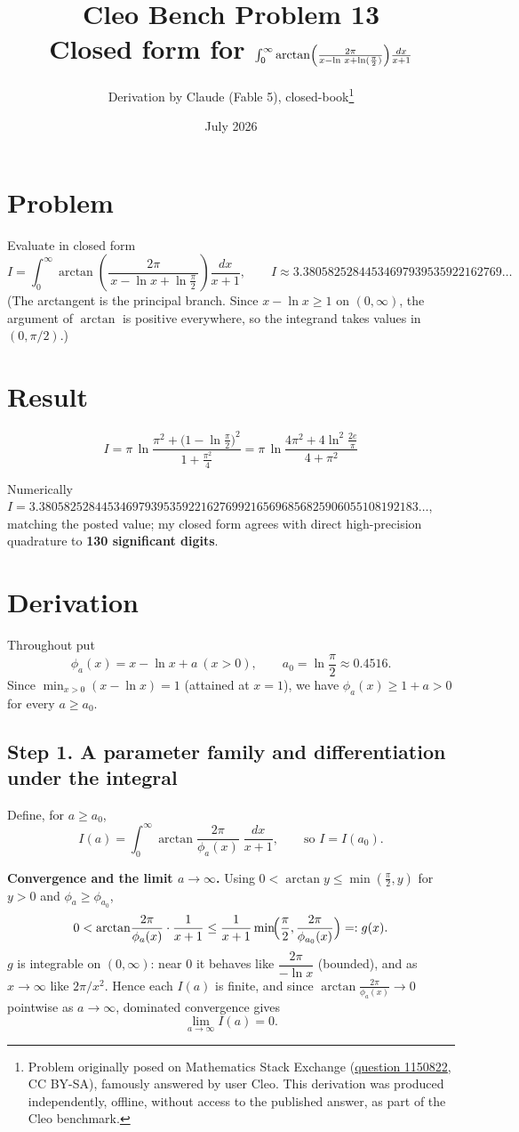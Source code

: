 \documentclass[11pt]{article}
\title{Cleo Bench Problem 13\\[1ex]\large Closed form for $\int_0^\infty\arctan\Bigl(\frac{2\pi}{x-\ln\,x+\ln(\frac\pi2)}\Bigr)\frac{dx}{x+1}$}
\author{Derivation by Claude (Fable 5), closed-book\thanks{Problem originally
posed on Mathematics Stack Exchange
(\href{https://math.stackexchange.com/q/1150822}{question 1150822}, CC BY-SA),
famously answered by user Cleo. This derivation was produced independently,
offline, without access to the published answer, as part of the Cleo benchmark.}}
\date{July 2026}
\theoremstyle{remark}
\begin{document}
\maketitle

\section*{Problem}

Evaluate in closed form
$$I=\int_0^\infty\arctan\!\left(\frac{2\pi}{\,x-\ln x+\ln\frac{\pi}{2}\,}\right)\frac{dx}{x+1},
\qquad I\approx 3.38058252844534697939535922162769\ldots$$
(The arctangent is the principal branch. Since $x-\ln x\ge 1$ on $(0,\infty)$, the argument of $\arctan$ is positive everywhere, so the integrand takes values in $(0,\pi/2)$.)

\section*{Result}

$$\boxed{\;I=\pi\,\ln\!\frac{\pi^{2}+\bigl(1-\ln\frac{\pi}{2}\bigr)^{2}}{1+\frac{\pi^{2}}{4}}
=\pi\,\ln\!\frac{4\pi^{2}+4\ln^{2}\!\frac{2e}{\pi}}{4+\pi^{2}}\;}$$

Numerically $I = 3.3805825284453469793953592216276992165696856825906055108192183\ldots$, matching the posted value; my closed form agrees with direct high-precision quadrature to \textbf{130 significant digits}.

\section*{Derivation}

Throughout put
$$\phi_a(x)=x-\ln x+a\ (x>0),\qquad a_0=\ln\frac{\pi}{2}\approx 0.4516 .$$
Since $\min_{x>0}(x-\ln x)=1$ (attained at $x=1$), we have $\phi_a(x)\ge 1+a>0$ for every $a\ge a_0$.

\subsection*{Step 1. A parameter family and differentiation under the integral}

Define, for $a\ge a_0$,
$$I(a)=\int_0^\infty \arctan\!\frac{2\pi}{\phi_a(x)}\;\frac{dx}{x+1},\qquad\text{so } I=I(a_0).$$

\textbf{Convergence and the limit $a\to\infty$.} Using $0<\arctan y\le \min(\tfrac\pi2 ,y)$ for $y>0$ and $\phi_a\ge\phi_{a_0}$,
$$0<\arctan\!\frac{2\pi}{\phi_a(x)}\cdot\frac1{x+1}\le \frac{1}{x+1}\min\!\Bigl(\frac\pi2,\frac{2\pi}{\phi_{a_0}(x)}\Bigr)=:g(x).$$
$g$ is integrable on $(0,\infty)$: near $0$ it behaves like $\dfrac{2\pi}{-\ln x}$ (bounded), and as $x\to\infty$ like $2\pi/x^{2}$. Hence each $I(a)$ is finite, and since $\arctan\frac{2\pi}{\phi_a(x)}\to0$ pointwise as $a\to\infty$, dominated convergence gives
\begin{equation*}
\lim_{a\to\infty}I(a)=0. \tag{1.1}
\end{equation*}
\end{document}
